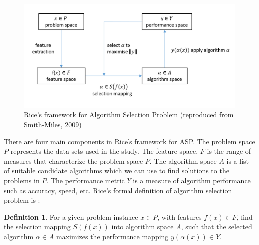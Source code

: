\documentclass[11pt,a4paper,]{article}
\theoremstyle{definition}
\newtheorem{definition}{Definition}[section]
\theoremstyle{definition}
\theoremstyle{definition}
\theoremstyle{remark}
\begin{document}
\begin{figure}

{\centering \includegraphics[width=\textwidth]{figures/RiceFramework} 

}

\caption{Rice's framework for Algorithm Selection Problem (reproduced from Smith-Miles, 2009)}\label{fig:rice}
\end{figure}

There are four main components in Rice's framework for ASP. The problem
space \(P\) represents the data sets used in the study. The feature
space, \(F\) is the range of measures that characterize the problem
space \(P\). The algorithm space \(A\) is a list of suitable candidate
algorithms which we can use to find solutions to the problems in \(P\).
The performance metric \(Y\) is a measure of algorithm performance such
as accuracy, speed, etc. Rice's formal definition of algorithm selection
problem is \autocite{smith2009cross}:

\begin{definition}
\label{def2}
For a given problem instance $x \in P$, with features $f(x) \in F$, find the selection mapping $S(f(x))$ into algorithm space $A$, such that the selected algorithm $\alpha \in A$ maximizes the performance mapping $y(\alpha(x)) \in Y$.
\end{definition}
\end{document}
